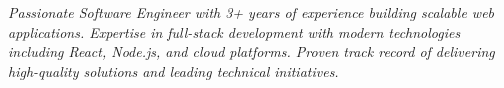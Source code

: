 
\begin{center}
    \colorbox{backgroundgray}{
        \begin{minipage}{0.95\textwidth}
            \centering
            \vspace{6pt}
            \textit{\color{textgray}Passionate Software Engineer with 3+ years of experience building scalable web applications. 
            Expertise in full-stack development with modern technologies including React, Node.js, and cloud platforms. 
            Proven track record of delivering high-quality solutions and leading technical initiatives.}
            \vspace{6pt}
        \end{minipage}
    }
\end{center}
\vspace{6pt} 